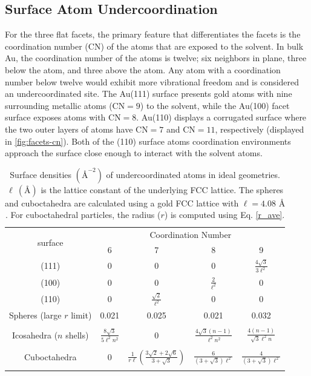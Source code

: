 \subsection{Surface Atom Undercoordination}
For the three flat facets, the primary feature that differentiates the
facets is the coordination number (CN) of the atoms that are exposed
to the solvent. In bulk Au, the coordination number of the atoms is
twelve; six neighbors in plane, three below the atom, and three above the
atom. Any atom with a coordination number below twelve would exhibit more
vibrational freedom and is considered an undercoordinated site. The
Au(111) surface presents gold atoms with nine surrounding metallic
atoms ($\text{CN} = 9$) to the solvent, while the Au(100) facet
surface exposes atoms with $\text{CN}=8$.  Au(110) displays a
corrugated surface where the two outer layers of atoms have
$\text{CN}=7$ and $\text{CN}=11$, respectively (displayed in \ref{fig:facets-cn}).
Both of the (110) surface atoms coordination environments
approach the surface close enough to interact with the solvent atoms.

\begin{table}
\centering
\caption{Surface densities $(\text{\AA}^{-2})$ of undercoordinated
  atoms in ideal geometries. $\ell~(\text{\AA})$ is the
  lattice constant of the underlying FCC lattice.  The spheres and
  cuboctahedra are calculated using a gold FCC lattice with $\ell = 4.08
  \text{~\AA}$.  For cuboctahedral particles, the radius ($r$) is computed
  using Eq. \eqref{r_ave}.
  \label{tab:undercoord}}
\begin{tabular}{ c|cccc }
\toprule
\multirow{2}{*}{surface} & \multicolumn{4}{c}{Coordination Number}\\
        & 6 & 7 & 8 & 9 \\
 \midrule
(111)      & 0 & 0     & 0     & $\frac{4 \sqrt{3}}{3 \ell^2}$ \\
(100)      & 0 & 0     & $\frac{2}{\ell^2}$ & 0     \\
(110)      & 0 & $\frac{\sqrt{2}}{\ell^2}$ & 0     & 0     \\
 \midrule
Spheres (large $r$ limit)    & 0.021 & 0.025 & 0.021 & 0.032\\ \\
Icosahedra ($n$ shells)  & $\frac{8\sqrt{3}}{5\ell^2n^2}$  &  0 &
 $\frac{4\sqrt{3}(n-1)}{\ell^2n^2}$ &
 $\frac{4(n - 1)}{\sqrt{3}\ell^2 n}$ \\ \\
Cuboctahedra & 0 & $\frac{1}{r\ell} \left(\frac{3\sqrt{2} + 2\sqrt{6}}{3+\sqrt{3}}\right)$ & $\frac{6}{(3+\sqrt{3})\ell^2}$ & $\frac{4}{(3+\sqrt{3})\ell^2}$\\ \\
\bottomrule
\end{tabular}
\end{table}


